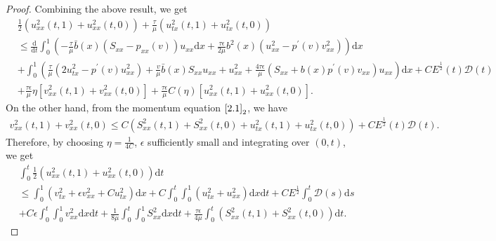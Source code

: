 \documentclass[10pt,a4paper]{amsart}
\newcommand{\dif}{\mathrm{d}}
\begin{document}
\begin{proof}
Combining the above result, we get
\begin{align*}
&\frac{1}{2} (u_{xx}^2(t,1)+u_{xx}^2(t,0))+\frac{\tau}{\mu} (u_{tx}^2 (t,1)+u_{tx}^2(t,0))\\
&\le \frac{\dif}{\dif t} \int_0^1 \left(-\frac{\tau}{\mu} \bar b(x) (S_{xx}-p_{xx}(v))u_{xx}\dif x+\frac{\tau \epsilon}{2\mu} b^2(x)(u_{xx}^2-p^\prime(v) v_{xx}^2)\right)\dif x\\
&+ \int_0^1\left( \frac{\tau}{\mu}(2 u_{tx}^2-p^\prime(v) u_{xx}^2 )+ \frac{v}{\mu} \bar b(x) S_{xx} u_{xx}+ u_{xx}^2+\frac{4\tau\epsilon}{\mu}  (S_{xx}+b(x)p^\prime(v) v_{xx}) u_{xx}\right) \dif x+C E^\frac{1}{2}(t)\mathcal D(t)\\
&+\frac{\tau\epsilon}{\mu} \eta[ v_{xx}^2(t,1)+v_{xx}^2(t,0)]+\frac{\tau\epsilon}{\mu} C(\eta) [u_{xx}^2(t,1)+u_{xx}^2(t,0)] .
\end{align*}
On the other hand, from the momentum equation $\eqref{2.1}_2$, we have
\begin{align*}
v_{xx}^2(t,1)+v_{xx}^2(t,0)\le C (S_{xx}^2(t,1)+S_{xx}^2(t,0)+u_{tx}^2(t,1)+u_{tx}^2(t,0))+C E^\frac{1}{2}(t)\mathcal D(t).
\end{align*}
Therefore, by choosing $\eta=\frac{1}{4C} $, $\epsilon$ sufficiently small and  integrating over $(0, t)$, we get
\begin{align}
&\int_0^t \frac{1}{2} (u_{xx}^2(t,1)+u_{xx}^2(t,0)) \dif t \nonumber\\
&\le \int_0^1 (v_{tx}^2+\epsilon  v_{xx}^2 +C u_{tx}^2)\dif x+C  \int_0^t\int_0^1 (u_{tx}^2+u_{xx}^2 )\dif x \dif t+CE^\frac{1}{2}\int_0^t \mathcal D(s)\dif s \nonumber\\
&+C \epsilon \int_0^t\int_0^1 v_{xx}^2\dif x \dif t +\frac{1}{8\mu} \int_0^t\int_0^1 S_{xx}^2 \dif x \dif t
+\frac{\tau \epsilon}{4\mu} \int_0^t (S_{xx}^2(t,1)+S_{xx}^2(t, 0)) \dif t . \label{3.28}
\end{align}


\end{proof}
\end{document}
